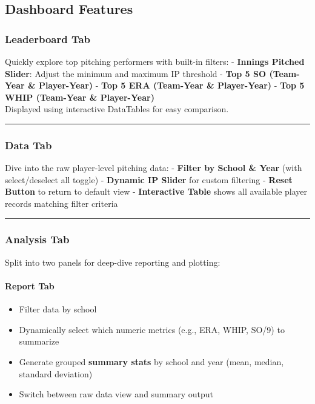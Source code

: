 \documentclass[
]{article}
\providecommand{\tightlist}{%
  \setlength{\itemsep}{0pt}\setlength{\parskip}{0pt}}
\begin{document}
\subsection{Dashboard Features}\label{dashboard-features}

\subsubsection{Leaderboard Tab}\label{leaderboard-tab}

Quickly explore top pitching performers with built-in filters: -
\textbf{Innings Pitched Slider}: Adjust the minimum and maximum IP
threshold - \textbf{Top 5 SO (Team-Year \& Player-Year)} - \textbf{Top 5
ERA (Team-Year \& Player-Year)} - \textbf{Top 5 WHIP (Team-Year \&
Player-Year)}\\
Displayed using interactive DataTables for easy comparison.

\begin{center}\rule{0.5\linewidth}{0.5pt}\end{center}

\subsubsection{Data Tab}\label{data-tab}

Dive into the raw player-level pitching data: - \textbf{Filter by School
\& Year} (with select/deselect all toggle) - \textbf{Dynamic IP Slider}
for custom filtering - \textbf{Reset Button} to return to default view -
\textbf{Interactive Table} shows all available player records matching
filter criteria

\begin{center}\rule{0.5\linewidth}{0.5pt}\end{center}

\subsubsection{Analysis Tab}\label{analysis-tab}

Split into two panels for deep-dive reporting and plotting:

\paragraph{Report Tab}\label{report-tab}

\begin{itemize}
\tightlist
\item
  Filter data by school
\item
  Dynamically select which numeric metrics (e.g., ERA, WHIP, SO/9) to
  summarize
\item
  Generate grouped \textbf{summary stats} by school and year (mean,
  median, standard deviation)
\item
  Switch between raw data view and summary output
\end{itemize}
\end{document}
